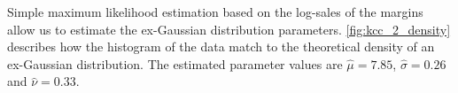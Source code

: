 
Simple maximum likelihood estimation based on the log-sales of the margins allow us to estimate the ex-Gaussian distribution parameters. \autoref{fig:kcc_2_density} describes how the histogram of the data match to the theoretical density of an ex-Gaussian distribution. The estimated parameter values are $\hat{\mu} = 7.85$, $\hat{\sigma} = 0.26$ and $\hat{\nu} = 0.33$.
\\










